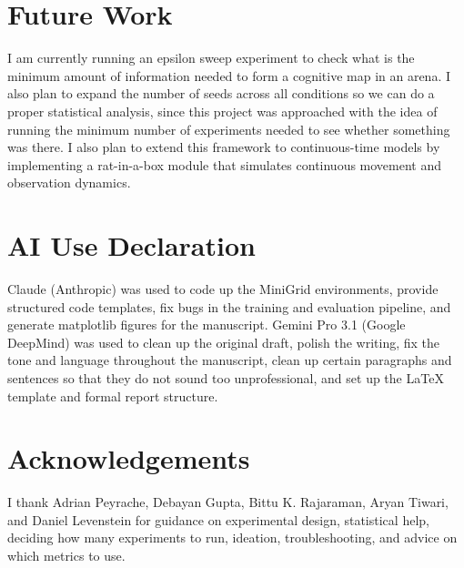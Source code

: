 ﻿\documentclass[11pt, a4paper]{article}
\begin{document}
\section*{Future Work}

I am currently running an epsilon sweep experiment to check what is the minimum amount of information needed to form a cognitive map in an arena. I also plan to expand the number of seeds across all conditions so we can do a proper statistical analysis, since this project was approached with the idea of running the minimum number of experiments needed to see whether something was there. I also plan to extend this framework to continuous-time models by implementing a rat-in-a-box module that simulates continuous movement and observation dynamics.

\section*{AI Use Declaration}

Claude (Anthropic) was used to code up the MiniGrid environments, provide structured code templates, fix bugs in the training and evaluation pipeline, and generate matplotlib figures for the manuscript. Gemini Pro 3.1 (Google DeepMind) was used to clean up the original draft, polish the writing, fix the tone and language throughout the manuscript, clean up certain paragraphs and sentences so that they do not sound too unprofessional, and set up the \LaTeX{} template and formal report structure.

\section*{Acknowledgements}

I thank Adrian Peyrache, Debayan Gupta, Bittu K. Rajaraman, Aryan Tiwari, and Daniel Levenstein for guidance on experimental design, statistical help, deciding how many experiments to run, ideation, troubleshooting, and advice on which metrics to use.



\end{document}
